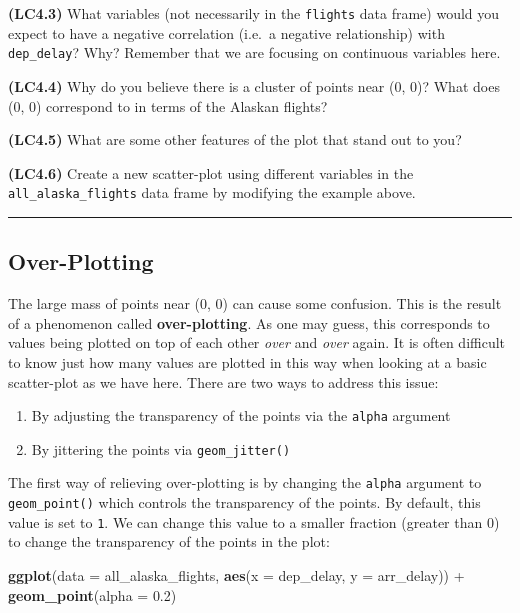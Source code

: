 \documentclass[]{tufte-book}
\newenvironment{Shaded}{\begin{snugshade}}{\end{snugshade}}
\newcommand{\KeywordTok}[1]{\textcolor[rgb]{0.13,0.29,0.53}{\textbf{{#1}}}}
\newcommand{\DataTypeTok}[1]{\textcolor[rgb]{0.13,0.29,0.53}{{#1}}}
\newcommand{\FloatTok}[1]{\textcolor[rgb]{0.00,0.00,0.81}{{#1}}}
\newcommand{\StringTok}[1]{\textcolor[rgb]{0.31,0.60,0.02}{{#1}}}
\newcommand{\NormalTok}[1]{{#1}}
\let\oldrule=\rule
\renewcommand{\rule}[1]{\oldrule{\linewidth}}
\providecommand{\tightlist}{%
  \setlength{\itemsep}{0pt}\setlength{\parskip}{0pt}}
\theoremstyle{definition}
\theoremstyle{definition}
\theoremstyle{remark}
\begin{document}
\textbf{(LC4.3)} What variables (not necessarily in the \texttt{flights}
data frame) would you expect to have a negative correlation (i.e.~a
negative relationship) with \texttt{dep\_delay}? Why? Remember that we
are focusing on continuous variables here.

\textbf{(LC4.4)} Why do you believe there is a cluster of points near
(0, 0)? What does (0, 0) correspond to in terms of the Alaskan flights?

\textbf{(LC4.5)} What are some other features of the plot that stand out
to you?

\textbf{(LC4.6)} Create a new scatter-plot using different variables in
the \texttt{all\_alaska\_flights} data frame by modifying the example
above.

\begin{center}\rule{0.5\linewidth}{\linethickness}\end{center}

\subsection{Over-Plotting}\label{over-plotting}

The large mass of points near (0, 0) can cause some confusion. This is
the result of a phenomenon called \textbf{over-plotting}. As one may
guess, this corresponds to values being plotted on top of each other
\emph{over} and \emph{over} again. It is often difficult to know just
how many values are plotted in this way when looking at a basic
scatter-plot as we have here. There are two ways to address this issue:

\begin{enumerate}
\def\labelenumi{\arabic{enumi}.}
\tightlist
\item
  By adjusting the transparency of the points via the \texttt{alpha}
  argument
\item
  By jittering the points via \texttt{geom\_jitter()}
\end{enumerate}

The first way of relieving over-plotting is by changing the
\texttt{alpha} argument to \texttt{geom\_point()} which controls the
transparency of the points. By default, this value is set to \texttt{1}.
We can change this value to a smaller fraction (greater than 0) to
change the transparency of the points in the plot:

\begin{Shaded}
\begin{Highlighting}[]
\KeywordTok{ggplot}\NormalTok{(}\DataTypeTok{data =} \NormalTok{all_alaska_flights, }\KeywordTok{aes}\NormalTok{(}\DataTypeTok{x =} \NormalTok{dep_delay, }\DataTypeTok{y =} \NormalTok{arr_delay)) +}\StringTok{ }
\StringTok{  }\KeywordTok{geom_point}\NormalTok{(}\DataTypeTok{alpha =} \FloatTok{0.2}\NormalTok{)}
\end{Highlighting}
\end{Shaded}
\end{document}
